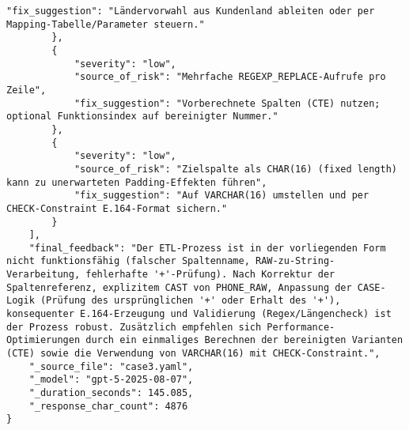 \begin{lstlisting}[caption={Ausgabe: GPT-5 Anwendungsfall 3 Robustheitsdurchlauf},label={gpt_case3_prompt3}]
            "fix_suggestion": "Ländervorwahl aus Kundenland ableiten oder per Mapping-Tabelle/Parameter steuern."
        },
        {
            "severity": "low",
            "source_of_risk": "Mehrfache REGEXP_REPLACE-Aufrufe pro Zeile",
            "fix_suggestion": "Vorberechnete Spalten (CTE) nutzen; optional Funktionsindex auf bereinigter Nummer."
        },
        {
            "severity": "low",
            "source_of_risk": "Zielspalte als CHAR(16) (fixed length) kann zu unerwarteten Padding-Effekten führen",
            "fix_suggestion": "Auf VARCHAR(16) umstellen und per CHECK-Constraint E.164-Format sichern."
        }
    ],
    "final_feedback": "Der ETL-Prozess ist in der vorliegenden Form nicht funktionsfähig (falscher Spaltenname, RAW-zu-String-Verarbeitung, fehlerhafte '+'-Prüfung). Nach Korrektur der Spaltenreferenz, explizitem CAST von PHONE_RAW, Anpassung der CASE-Logik (Prüfung des ursprünglichen '+' oder Erhalt des '+'), konsequenter E.164-Erzeugung und Validierung (Regex/Längencheck) ist der Prozess robust. Zusätzlich empfehlen sich Performance-Optimierungen durch ein einmaliges Berechnen der bereinigten Varianten (CTE) sowie die Verwendung von VARCHAR(16) mit CHECK-Constraint.",
    "_source_file": "case3.yaml",
    "_model": "gpt-5-2025-08-07",
    "_duration_seconds": 145.085,
    "_response_char_count": 4876
}
\end{lstlisting}

